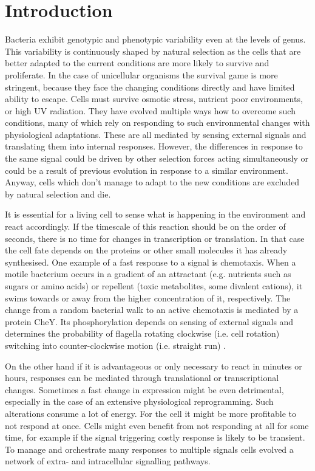 \chapter{Introduction}
\setcounter{page}{1}

\shorthandoff{-}

Bacteria exhibit genotypic and phenotypic variability even at the levels of genus.
This variability is continuously shaped by natural selection as the cells that are better adapted to the current conditions are more likely to survive and proliferate.
In the case of unicellular organisms the survival game is more stringent, because they face the changing conditions directly and have limited ability to escape.
Cells must survive osmotic stress, nutrient poor environments, or high UV radiation. They have evolved multiple ways how to overcome such conditions, many of which rely on responding to such environmental changes with physiological adaptations.
These are all mediated by sensing external signals and translating them into internal responses.
However, the differences in response to the same signal could be driven by other selection forces acting simultaneously or could be a result of previous evolution in response to a similar environment.
Anyway, cells which don't manage to adapt to the new conditions are excluded by natural selection and die.

It is essential for a living cell to sense what is happening in the environment and react accordingly.
If the timescale of this reaction should be on the order of seconds, there is no time for changes in transcription or translation.
In that case the cell fate depends on the proteins or other small molecules it has already synthesised.
One example of a fast response to a signal is chemotaxis.
When a motile bacterium occurs in a gradient of an attractant (e.g. nutrients such as sugars or amino acids) or repellent (toxic metabolites, some divalent cations), it swims towards or away from the higher concentration of it, respectively.
The change from a random bacterial walk to an active chemotaxis is mediated by a protein CheY.
Its phosphorylation depends on sensing of external signals and determines the probability of flagella rotating clockwise (i.e. cell rotation) switching into counter-clockwise motion (i.e. straight run) \cite{shimizu2010modular, mears2014escherichia}.

On the other hand if it is advantageous or only necessary to react in minutes or hours, responses can be mediated through translational or transcriptional changes.
Sometimes a fast change in expression might be even detrimental, especially in the case of an extensive physiological reprogramming.
Such alterations consume a lot of energy.
For the cell it might be more profitable to not respond at once.
Cells might even benefit from not responding at all for some time, for example if the signal triggering costly response is likely to be transient.
To manage and orchestrate many responses to multiple signals cells evolved a network of extra- and intracellular signalling pathways.

